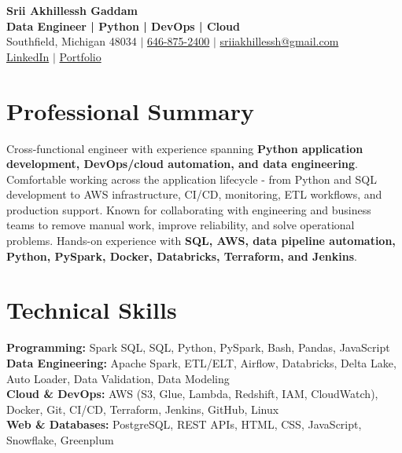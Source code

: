 \documentclass[letterpaper,10pt]{article}
\begin{document}
\fontsize{9.35pt}{10.45pt}\selectfont

\begin{center}
    {\LARGE \textbf{Srii Akhillessh Gaddam}} \\[-1pt]
    \textbf{Data Engineer | Python | DevOps | Cloud} \\[2pt]
    Southfield, Michigan 48034 $|$
    \href{tel:6468752400}{646-875-2400} $|$
    \href{mailto:sriiakhillessh@gmail.com}{sriiakhillessh@gmail.com} \\[1pt]
    \href{https://www.linkedin.com/in/srii-akhiilessh-gaddam-b48668191/}{LinkedIn} $|$
    \href{https://sriiakhillesshg.github.io/portfolio/}{Portfolio}
\end{center}
\vspace{-8pt}

\section{Professional Summary}
\small{Cross-functional engineer with experience spanning \textbf{Python application development, DevOps/cloud automation, and data engineering}. Comfortable working across the application lifecycle - from Python and SQL development to AWS infrastructure, CI/CD, monitoring, ETL workflows, and production support. Known for collaborating with engineering and business teams to remove manual work, improve reliability, and solve operational problems. Hands-on experience with \textbf{SQL, AWS, data pipeline automation, Python, PySpark, Docker, Databricks, Terraform, and Jenkins}.}

\section{Technical Skills}
\small{
\textbf{Programming:} Spark SQL, SQL, Python, PySpark, Bash, Pandas, JavaScript \\
\textbf{Data Engineering:} Apache Spark, ETL/ELT, Airflow, Databricks, Delta Lake, Auto Loader, Data Validation, Data Modeling \\
\textbf{Cloud \& DevOps:} AWS (S3, Glue, Lambda, Redshift, IAM, CloudWatch), Docker, Git, CI/CD, Terraform, Jenkins, GitHub, Linux \\
\textbf{Web \& Databases:} PostgreSQL, REST APIs, HTML, CSS, JavaScript, Snowflake, Greenplum
}

\end{document}
